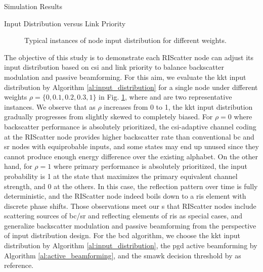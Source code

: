\documentclass[journal]{IEEEtran}
\begin{document}
\begin{section}{Simulation Results}
	\begin{subsection}{Input Distribution versus Link Priority}
		\begin{figure}[!t]
			\centering
			\caption{Typical instances of node input distribution for different weights.}
			\label{fi:distribution_weights}
		\end{figure}
		The objective of this study is to demonstrate each RIScatter node can adjust its input distribution based on \gls{csi} and link priority to balance backscatter modulation and passive beamforming.
		For this aim, we evaluate the \gls{kkt} input distribution by Algorithm \ref{al:input_distribution} for a single node under different weights $\rho=\{0,0.1,0.2,0.3,1\}$ in Fig. \ref{fi:distribution_weights}, where  and  are two representative instances.
		We observe that as $\rho$ increases from \num{0} to \num{1}, the \gls{kkt} input distribution
		gradually progresses from slightly skewed to completely biased.
		For $\rho=0$ where backscatter performance is absolutely prioritized, the \gls{csi}-adaptive channel coding at the RIScatter node provides higher backscatter rate than conventional \gls{bc} and \gls{sr} nodes with equiprobable inputs, and some states may end up unused since they cannot produce enough energy difference over the existing alphabet.
		On the other hand, for $\rho=1$ where primary performance is absolutely prioritized, the input probability is \num{1} at the state that maximizes the primary equivalent channel strength, and \num{0} at the others.
		In this case, the reflection pattern over time is fully deterministic, and the RIScatter node indeed boils down to a \gls{ris} element with discrete phase shifts.
		Those observations meet our s that RIScatter nodes include scattering sources of \gls{bc}/\gls{sr} and reflecting elements of \gls{ris} as special cases, and generalize backscatter modulation and passive beamforming from the perspective of input distribution design.
		For the \gls{bcd} algorithm, we choose the \gls{kkt} input distribution by Algorithm \ref{al:input_distribution}, the \gls{pgd} active beamforming by Algorithm \ref{al:active_beamforming}, and the \gls{smawk} decision threshold by \cite{He2021} as reference.
	\end{subsection}


\end{section}
\end{document}
